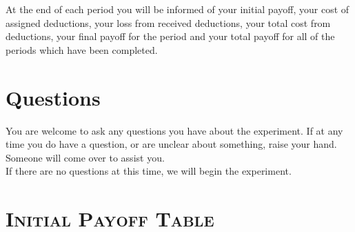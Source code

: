 \documentclass[12pt]{article}
\begin{document}
At the end of each period you will be informed of your initial payoff, your cost of assigned deductions, your loss from received deductions, your total cost from deductions, your final payoff for the period and your total payoff for all of the periods which have been completed.

\section*{Questions}


You are welcome to ask any questions you have about the experiment.  If at any time you do have a question, or are unclear about something, raise your hand. Someone will come over to assist you.\\

If there are no questions at this time, we will begin the experiment.\\


\newpage

\section*{\bf \scshape Initial Payoff Table}
\end{document}
